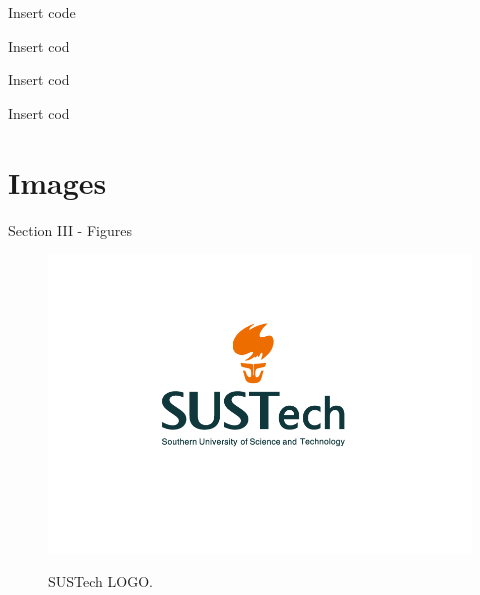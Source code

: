 \documentclass{libs/ufc_format}
\begin{document}

\begin{frame}{Insert code}
    \lstset{language=Python}
    
\end{frame}

\begin{frame}{Insert cod}
    
\end{frame}

\begin{frame}{Insert cod}
    
\end{frame}

\begin{frame}{Insert cod}
    
\end{frame}


\section{Images}
\begin{frame}{Section III - Figures}
    \begin{figure}
        \centering
        \caption{SUSTech LOGO.}
        \includegraphics[scale=0.3]{libs/LOGO.png}
        \label{fig:ufc_emblem}
    \end{figure}
\end{frame}
\end{document}
